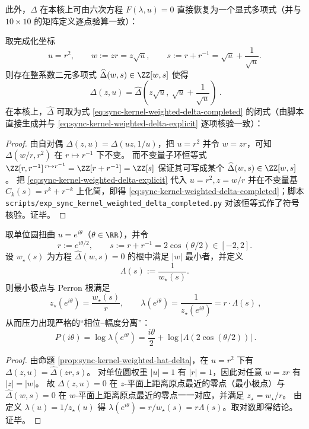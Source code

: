 此外，\(\Delta\) 在本核上可由六次方程 \(F(\lambda,u)=0\) 直接恢复为一个显式多项式（并与 \(10\times 10\) 的矩阵定义逐点验算一致）：

\begin{proposition}[完成化行列式的二元闭式：\texorpdfstring{$\Delta(z,u)=\widehat\Delta(w,s)$}{Delta=hatDelta}]\label{prop:sync-kernel-weighted-hat-delta}
取完成化坐标
\[
u=r^2,\qquad w:=zr=z\sqrt{u},\qquad s:=r+r^{-1}=\sqrt{u}+\frac{1}{\sqrt{u}}.
\]
则存在整系数二元多项式 \(\widehat\Delta(w,s)\in\ZZ[w,s]\) 使得
\[
\boxed{\ \Delta(z,u)=\widehat\Delta\!\left(z\sqrt{u},\ \sqrt{u}+\frac{1}{\sqrt{u}}\right)\ }.
\]
在本核上，\(\widehat\Delta\) 可取为式 \eqref{eq:sync-kernel-weighted-delta-completed} 的闭式（由脚本直接生成并与 \eqref{eq:sync-kernel-weighted-delta-explicit} 逐项核验一致）：

\end{proposition}
\begin{proof}
由自对偶 \(\Delta(z,u)=\Delta(uz,1/u)\)，把 \(u=r^2\) 并令 \(w=zr\)，可知
\(
\Delta(w/r,r^2)
\)
在 \(r\mapsto r^{-1}\) 下不变。
而不变量子环恒等式
\(
\ZZ[r,r^{-1}]^{\,r\mapsto r^{-1}}=\ZZ[r+r^{-1}]=\ZZ[s]
\)
保证其可写成某个 \(\widehat\Delta(w,s)\in\ZZ[w,s]\)。
把 \eqref{eq:sync-kernel-weighted-delta-explicit} 代入 \(u=r^2,z=w/r\) 并在不变量基 \(C_k(s)=r^k+r^{-k}\) 上化简，即得 \eqref{eq:sync-kernel-weighted-delta-completed}；脚本 \texttt{scripts/exp\_sync\_kernel\_weighted\_delta\_completed.py} 对该恒等式作了符号核验。证毕。
\end{proof}

\begin{corollary}[单位圆扭曲的相位--幅度分离：\texorpdfstring{$P(i\theta)=\frac{i\theta}{2}+\log|\Lambda(s)|$}{P(i theta)=i theta/2 + log|Lambda(s)|}]\label{cor:sync-kernel-weighted-phase-amplitude}
取单位圆扭曲 \(u=e^{i\theta}\)（\(\theta\in\RR\)），并令
\[
r:=e^{i\theta/2},\qquad s:=r+r^{-1}=2\cos(\theta/2)\in[-2,2].
\]
设 \(w_\star(s)\) 为方程 \(\widehat\Delta(w,s)=0\) 的根中满足 \(|w|\) 最小者，并定义
\[
\Lambda(s):=\frac{1}{w_\star(s)}.
\]
则最小极点与 Perron 根满足
\[
\boxed{\ z_\star(e^{i\theta})=\frac{w_\star(s)}{r},\qquad \lambda(e^{i\theta})=\frac{1}{z_\star(e^{i\theta})}=r\cdot \Lambda(s)\ },
\]
从而压力出现严格的“相位--幅度分离”：
\[
\boxed{\ P(i\theta)=\log\lambda(e^{i\theta})=\frac{i\theta}{2}+\log|\Lambda(2\cos(\theta/2))|\ }.
\]
\end{corollary}
\begin{proof}
由命题 \ref{prop:sync-kernel-weighted-hat-delta}，在 \(u=r^2\) 下有
\(
\Delta(z,u)=\widehat\Delta(zr,s)
\)。
对单位圆权重 \(|u|=1\) 有 \(|r|=1\)，因此对任意 \(w=zr\) 有 \(|z|=|w|\)。
故 \(\Delta(z,u)=0\) 在 \(z\)-平面上距离原点最近的零点（最小极点）与 \(\widehat\Delta(w,s)=0\) 在 \(w\)-平面上距离原点最近的零点一一对应，并满足 \(z_\star=w_\star/r\)。
由定义 \(\lambda(u)=1/z_\star(u)\) 得 \(\lambda(e^{i\theta})=r/w_\star(s)=r\Lambda(s)\)。取对数即得结论。证毕。
\end{proof}

